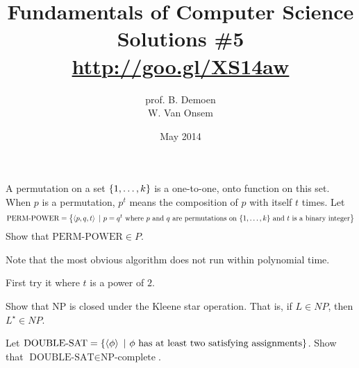 \documentclass{article}
\title{Fundamentals of Computer Science\\Solutions \#5\\\url{http://goo.gl/XS14aw}}
\author{prof. B. Demoen\\W. Van Onsem}
\date{May 2014}
\begin{document}
\maketitle
\begin{exercise}
A permutation on a set $\left\{ 1,\ldots,k \right\}$ is a one-to-one, onto function on this set. When $p$ is a permutation, $p^t$ means the composition of $p$ with itself $t$ times. Let
\begin{equation}
\mbox{PERM-POWER}=\left\{ \left\langle p, q, t \right\rangle\ |\ p = q^t\mbox{ where $p$ and $q$ are permutations on $\left\{ 1,\ldots,k \right\}$ and $t$ is a binary integer} \right\}
\end{equation}
Show that $\mbox{PERM-POWER}\in P$.
\begin{note}
Note that the most obvious algorithm does not run within polynomial time.
\end{note}
\begin{hint}
First try it where $t$ is a power of $2$.
\end{hint}
\begin{answer}

\end{answer}
\end{exercise}

\begin{exercise}
Show that NP is closed under the Kleene star operation. That is, if $L\in NP$, then $L^{\star}\in NP$.
\begin{answer}

\end{answer}
\end{exercise}

\begin{exercise}
Let $\mbox{DOUBLE-SAT}=\left\{ \left\langle \phi \right\rangle\ |\ \phi\mbox{ has at least two satisfying assignments} \right\}$. Show that $\mbox{DOUBLE-SAT}\in\mbox{NP-complete}$.
\begin{answer}

\end{answer}
\end{exercise}
\end{document}
